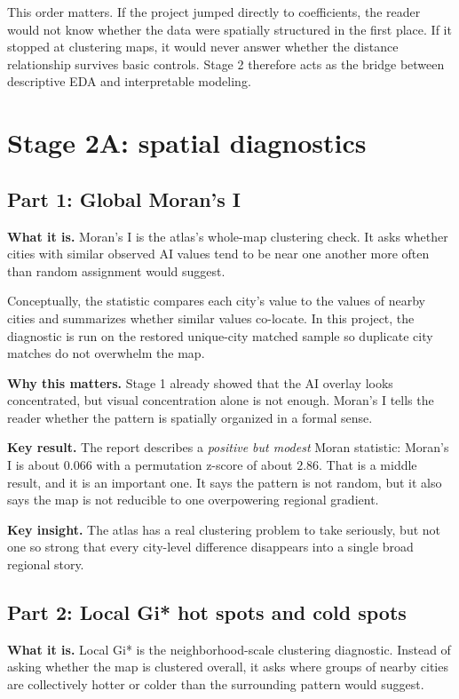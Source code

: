 \documentclass[11pt]{article}
\begin{document}
This order matters. If the project jumped directly to coefficients, the reader would not know whether the data were spatially structured in the first place. If it stopped at clustering maps, it would never answer whether the distance relationship survives basic controls. Stage 2 therefore acts as the bridge between descriptive EDA and interpretable modeling.

\section{Stage 2A: spatial diagnostics}

\subsection{Part 1: Global Moran's I}
\textbf{What it is.} Moran's I is the atlas's whole-map clustering check. It asks whether cities with similar observed AI values tend to be near one another more often than random assignment would suggest.

Conceptually, the statistic compares each city's value to the values of nearby cities and summarizes whether similar values co-locate. In this project, the diagnostic is run on the restored unique-city matched sample so duplicate city matches do not overwhelm the map.

\textbf{Why this matters.} Stage 1 already showed that the AI overlay looks concentrated, but visual concentration alone is not enough. Moran's I tells the reader whether the pattern is spatially organized in a formal sense.

\textbf{Key result.} The report describes a \emph{positive but modest} Moran statistic: Moran's I is about $0.066$ with a permutation z-score of about $2.86$. That is a middle result, and it is an important one. It says the pattern is not random, but it also says the map is not reducible to one overpowering regional gradient.

\textbf{Key insight.} The atlas has a real clustering problem to take seriously, but not one so strong that every city-level difference disappears into a single broad regional story.

\subsection{Part 2: Local Gi* hot spots and cold spots}
\textbf{What it is.} Local Gi* is the neighborhood-scale clustering diagnostic. Instead of asking whether the map is clustered overall, it asks where groups of nearby cities are collectively hotter or colder than the surrounding pattern would suggest.
\end{document}
